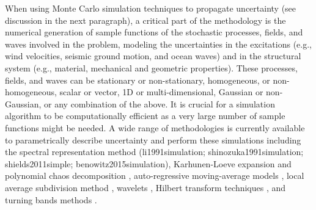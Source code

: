 When using Monte Carlo simulation techniques to propagate uncertainty (see discussion in the next paragraph), a critical part of the methodology is the numerical generation of sample functions of the stochastic processes, fields, and waves involved in the problem, modeling the uncertainties in the excitations (e.g., wind velocities, seismic ground motion, and ocean waves) and in the structural system (e.g., material, mechanical and geometric properties). These processes, fields, and waves can be stationary or non-stationary, homogeneous, or non-homogeneous, scalar or vector, 1D or multi-dimensional, Gaussian or non-Gaussian, or any combination of the above. It is crucial for a simulation algorithm to be computationally efficient as a very large number of sample functions might be needed. A wide range of methodologies is currently available to parametrically describe uncertainty and perform these simulations including the spectral representation method (li1991simulation; shinozuka1991simulation; shields2011simple; benowitz2015simulation), Karhunen-Loeve expansion and polynomial chaos decomposition \citep{ghanem1991stochastic}, auto-regressive moving-average models \citep{spanos1983arma,deodatis1988autoregressive}, local average subdivision method \citep{fenton1990simulation}, wavelets \citep{zeldin1996random}, Hilbert transform techniques \citep{wang2014modeling}, and turning bands methods \citep{mantoglou1982turning}.

